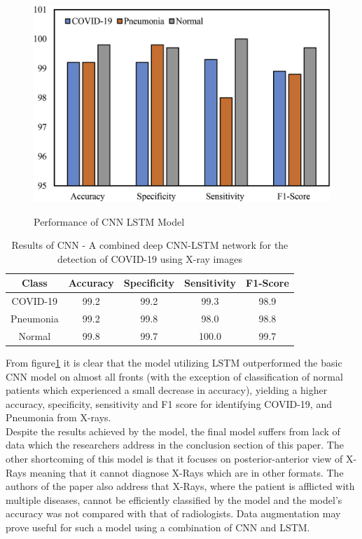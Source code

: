  \begin{figure}[H]
    \centering
    \includegraphics[width=1\textwidth,height=0.5\textheight]{Images/performanceOfCNNLSTM-LSTMPaper.png}\\
    \caption{Performance of CNN LSTM Model\cite{litReviewCnnLstm}}
    \label{fig:Performance of CNN LSTM Model Literature Review}
\end{figure}
\vspace{0.5mm}
\begin{table}[h]
    \centering
    \begin{tabular}{|c|c|c|c|c|}
    \hline
         Class
         & Accuracy
         & Specificity
         & Sensitivity
         & F1-Score\\
         \hline
         COVID-19 & 99.2 &  99.2 & 99.3 & 98.9 \\
         Pneumonia & 99.2 & 99.8 & 98.0 & 98.8 \\
         Normal & 99.8 & 99.7 & 100.0 & 99.7\\
         \hline
    \end{tabular}
    \caption{Results of CNN - A combined deep CNN-LSTM network for the detection of COVID-19 using X-ray images}
    \label{tab:Results of CNN LSTM - A combined deep CNN-LSTM network for the detection of novel coronavirus (COVID-19) using X-ray images}
\end{table}
From figure\ref{fig:Performance of CNN LSTM Model Literature Review} it is clear that the model utilizing LSTM outperformed the basic CNN model on almost all fronts (with the exception of classification of normal patients which experienced a small decrease in accuracy), yielding a higher accuracy, specificity, sensitivity and F1 score for identifying COVID-19, and Pneumonia from X-rays.
\\
Despite the results achieved by the model, the final model suffers from lack of data which the researchers address in the conclusion section of this paper.  The other shortcoming of this model is that it focuses on posterior-anterior view of X-Rays meaning that it cannot diagnose X-Rays which are in other formats.  The authors of the paper also address that X-Rays, where the patient is afflicted with multiple diseases, cannot be efficiently classified by the model and the model's accuracy was not compared with that of radiologists.  Data augmentation may prove useful for such a model using a combination of CNN and LSTM.
\\
